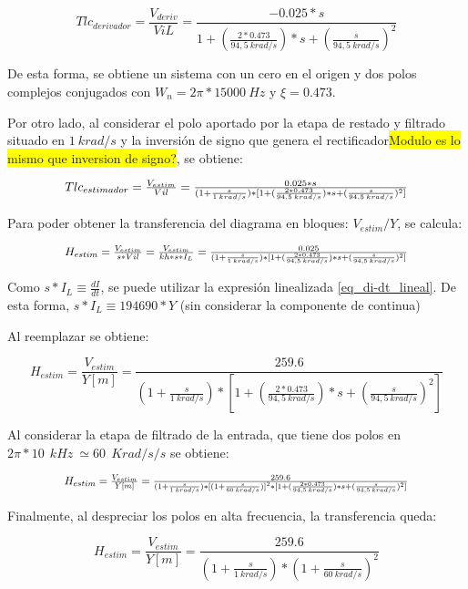 \begin{equation} \label{eq_TLC_deriv_1}
	{Tlc}_{derivador}=\frac{V_{deriv}}{ViL}=\frac{-0.025*s}{1+(\frac{2*0.473}{94,5\ krad/s})*s+(\frac{s}{94,5\ krad/s})^2}
\end{equation}

\noindent De esta forma, se obtiene un sistema con un cero en el origen y dos polos complejos conjugados con $W_n=2\pi *15000 \:Hz$ y  $\xi =0.473$.

\noindent Por otro lado, al considerar el polo aportado por la etapa de restado y filtrado situado en $1 \:{krad/s}$ y la inversi\'{o}n de signo que genera el rectificador\colorbox{yellow}{Modulo es lo mismo que inversion de signo?}, se obtiene:

\begin{equation} \label{eq_TLC_deriv_2}
	\resizebox{.8\hsize}{!}
	{
	$
	{Tlc}_{estimador}=\frac{V_{estim}}{Vil}=\frac{0.025*s}{(1+\frac{s}{1 \:{krad/s}})*[1+(\frac{2*0.473}{94,5 \:{krad/s}})*s+(\frac{s}{94,5 \:{krad/s}})^2]}
	$
	}
\end{equation}

\noindent Para poder obtener la transferencia del diagrama en bloques: $V_{estim}/Y$, se calcula:

\begin{equation} \label{eq_TLC_deriv_3}
	\resizebox{.8\hsize}{!}
	{
	$
	H_{estim}=\frac{V_{estim}}{s*Vil}=\frac{V_{estim}}{kh*s*I_L}=\frac{0.025}{(1+\frac{s}{1\: krad/s})*[1+(\frac{2*0.473}{94,5\: krad/s})*s+(\frac{s}{94,5\: krad/s})^2]}
	$
	}
\end{equation}

\noindent Como $s*I_L\equiv \frac{dI}{dt}$, se puede utilizar la expresi\'{o}n linealizada \ref{eq_di-dt_lineal}. De esta forma,  $s*I_L\equiv 194690*Y$ (sin considerar la componente de continua)

\noindent Al reemplazar se obtiene:

\begin{equation} \label{eq_TLC_deriv_5}
	H_{estim}=\frac{V_{estim}}{Y[m]}=\frac{259.6}{(1+\frac{s}{1\ krad/s})*[1+(\frac{2*0.473}{94,5\: krad/s})*s+(\frac{s}{94,5\: krad/s})^2]}
\end{equation}

\noindent Al considerar la etapa de filtrado de la entrada, que tiene dos polos en $2\pi *10\: \:{kHz}\ \simeq 60\: \:{Krad/s}/s$ se obtiene:

\begin{equation} \label{eq_TLC_deriv_6}
	\resizebox{.8\hsize}{!}
	{
		$
	H_{estim}=\frac{V_{estim}}{Y[m]}=\frac{259.6}{(1+\frac{s}{1\: krad/s})*{[(1+\frac{s}{60\: krad/s})]}^2*[1+(\frac{2*0.473}{94,5\: krad/s})*s+(\frac{s}{94,5\: krad/s})^2]}
	$
	}
\end{equation}

\noindent Finalmente, al despreciar los polos en alta frecuencia, la transferencia queda:

\begin{equation} \label{eq_TLC_deriv_7}
	H_{estim}=\frac{V_{estim}}{Y[m]}=\frac{259.6}{(1+\frac{s}{1\: krad/s})*{(1+\frac{s}{60\: krad/s})}^2}
\end{equation}